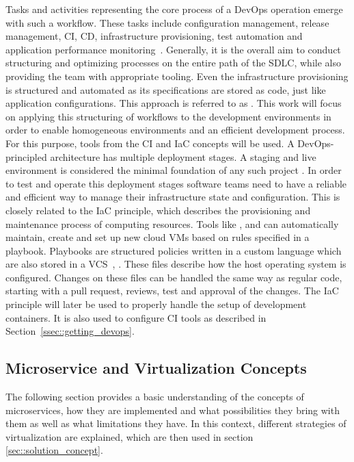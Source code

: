         \noindent Tasks and activities representing the core process of a DevOps operation emerge with such a workflow. These tasks include configuration management, release management, \ac{CI}, \ac{CD}, infrastructure provisioning, test automation and application performance monitoring~\cite{azuredevops}.
        Generally, it is the overall aim to conduct structuring and optimizing processes on the entire path of the \ac{SDLC}, while also providing the team with appropriate tooling. Even the infrastructure provisioning is structured and automated as its specifications are stored as code, just like application configurations. This approach is referred to as  \cite{base_devops}. This work will focus on applying this structuring of workflows to the development environments in order to enable homogeneous environments and an efficient development process. For this purpose, tools from the \ac{CI} and \ac{IaC} concepts will be used. \newline
        A DevOps-principled architecture has multiple deployment stages. A staging and live environment is considered the minimal foundation of any such project \cite{azuredevops}. In order to test and operate this deployment stages software teams need to have a reliable and efficient way to manage their infrastructure state and configuration. This is closely related to the \ac{IaC} principle, which describes the provisioning and maintenance process of computing resources. Tools like ,  and  can automatically maintain, create and set up new cloud \ac{VM}s based on rules specified in a playbook. Playbooks are structured policies written in a custom language which are also stored in a \ac{VCS}~\cite{ansible2020}, \cite{azuredevops}. These files describe how the host operating system is configured. Changes on these files can be handled the same way as regular code, starting with a pull request, reviews, test and approval of the changes. The \acl{IaC} principle will later be used to properly handle the setup of development containers. It is also used to configure \acs{CI} tools as described in Section~\ref{ssec::getting_devops}.

    \subsection{Microservice and Virtualization Concepts}\label{ssec::microservices}
    The following section provides a basic understanding of the concepts of microservices, how they are implemented and what possibilities they bring with them as well as what limitations they have. In this context, different strategies of virtualization are explained, which are then used in section \ref{sec::solution_concept}.

